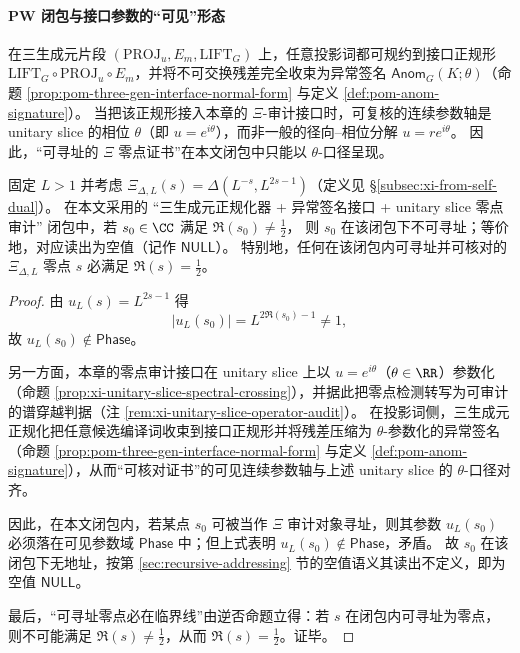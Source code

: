 \paragraph{\(\mathbf{PW}\) 闭包与接口参数的“可见”形态}
在三生成元片段 \((\mathrm{PROJ}_u,E_m,\mathrm{LIFT}_G)\) 上，任意投影词都可规约到接口正规形
\(\mathrm{LIFT}_G\circ\mathrm{PROJ}_u\circ E_m\)，并将不可交换残差完全收束为异常签名 \(\mathsf{Anom}_G(K;\theta)\)（命题 \ref{prop:pom-three-gen-interface-normal-form} 与定义 \ref{def:pom-anom-signature}）。
当把该正规形接入本章的 \(\Xi\)-审计接口时，可复核的连续参数轴是 unitary slice 的相位 \(\theta\)（即 \(u=e^{i\theta}\)），而非一般的径向--相位分解 \(u=re^{i\theta}\)。
因此，“可寻址的 \(\Xi\) 零点证书”在本文闭包中只能以 \(\theta\)-口径呈现。

\begin{theorem}\label{thm:xi-offset-null-type-safety}
固定 \(L>1\) 并考虑 \(\Xi_{\Delta,L}(s)=\Delta(L^{-s},L^{2s-1})\)（定义见 \S\ref{subsec:xi-from-self-dual}）。
在本文采用的 “三生成元正规化器 + 异常签名接口 + unitary slice 零点审计” 闭包中，若 \(s_0\in\CC\) 满足
\(\Re(s_0)\neq \tfrac12\)，
则 \(s_0\) 在该闭包下不可寻址；等价地，对应读出为空值（记作 \(\mathsf{NULL}\)）。
特别地，任何在该闭包内可寻址并可核对的 \(\Xi_{\Delta,L}\) 零点 \(s\) 必满足 \(\Re(s)=\tfrac12\)。
\end{theorem}

\begin{proof}
由 \(u_L(s)=L^{2s-1}\) 得
\[
|u_L(s_0)|=L^{2\Re(s_0)-1}\neq 1,
\]
故 \(u_L(s_0)\notin\mathsf{Phase}\)。
\par
另一方面，本章的零点审计接口在 unitary slice 上以 \(u=e^{i\theta}\)（\(\theta\in\RR\)）参数化（命题 \ref{prop:xi-unitary-slice-spectral-crossing}），并据此把零点检测转写为可审计的谱穿越判据（注 \ref{rem:xi-unitary-slice-operator-audit}）。
在投影词侧，三生成元正规化把任意候选编译词收束到接口正规形并将残差压缩为 \(\theta\)-参数化的异常签名（命题 \ref{prop:pom-three-gen-interface-normal-form} 与定义 \ref{def:pom-anom-signature}），从而“可核对证书”的可见连续参数轴与上述 unitary slice 的 \(\theta\)-口径对齐。
\par
因此，在本文闭包内，若某点 \(s_0\) 可被当作 \(\Xi\) 审计对象寻址，则其参数 \(u_L(s_0)\) 必须落在可见参数域 \(\mathsf{Phase}\) 中；但上式表明 \(u_L(s_0)\notin\mathsf{Phase}\)，矛盾。
故 \(s_0\) 在该闭包下无地址，按第 \ref{sec:recursive-addressing} 节的空值语义其读出不定义，即为空值 \(\mathsf{NULL}\)。
\par
最后，“可寻址零点必在临界线”由逆否命题立得：若 \(s\) 在闭包内可寻址为零点，则不可能满足 \(\Re(s)\neq\tfrac12\)，从而 \(\Re(s)=\tfrac12\)。证毕。
\end{proof}

